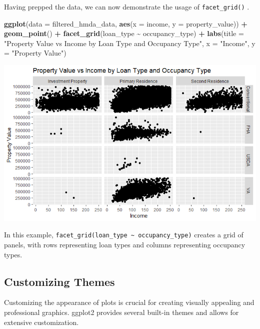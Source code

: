 \documentclass[
]{book}
\newenvironment{Shaded}{\begin{snugshade}}{\end{snugshade}}
\newcommand{\AttributeTok}[1]{\textcolor[rgb]{0.13,0.29,0.53}{#1}}
\newcommand{\FunctionTok}[1]{\textcolor[rgb]{0.13,0.29,0.53}{\textbf{#1}}}
\newcommand{\NormalTok}[1]{#1}
\newcommand{\SpecialCharTok}[1]{\textcolor[rgb]{0.81,0.36,0.00}{\textbf{#1}}}
\newcommand{\StringTok}[1]{\textcolor[rgb]{0.31,0.60,0.02}{#1}}
\begin{document}
Having prepped the data, we can now demonstrate the usage of \texttt{facet\_grid()} .

\begin{Shaded}
\begin{Highlighting}[]
\FunctionTok{ggplot}\NormalTok{(}\AttributeTok{data =}\NormalTok{ filtered\_hmda\_data, }\FunctionTok{aes}\NormalTok{(}\AttributeTok{x =}\NormalTok{ income, }\AttributeTok{y =}\NormalTok{ property\_value)) }\SpecialCharTok{+}
  \FunctionTok{geom\_point}\NormalTok{() }\SpecialCharTok{+}
  \FunctionTok{facet\_grid}\NormalTok{(loan\_type }\SpecialCharTok{\textasciitilde{}}\NormalTok{ occupancy\_type) }\SpecialCharTok{+}
  \FunctionTok{labs}\NormalTok{(}\AttributeTok{title =} \StringTok{"Property Value vs Income by Loan Type and Occupancy Type"}\NormalTok{,}
       \AttributeTok{x =} \StringTok{"Income"}\NormalTok{,}
       \AttributeTok{y =} \StringTok{"Property Value"}\NormalTok{)}
\end{Highlighting}
\end{Shaded}

\includegraphics{images/Facet_Grid.PNG}

In this example, \texttt{facet\_grid(loan\_type\ \textasciitilde{}\ occupancy\_type)} creates a grid of panels, with rows representing loan types and columns representing occupancy types.

\hypertarget{customizing-themes}{%
\subsection{Customizing Themes}\label{customizing-themes}}

Customizing the appearance of plots is crucial for creating visually appealing and professional graphics. ggplot2 provides several built-in themes and allows for extensive customization.
\end{document}
